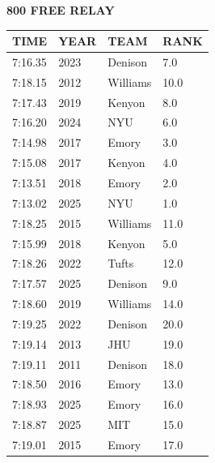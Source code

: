 \begin{table}[H]
\centering
\begin{minipage}[t]{0.6\textwidth}
\centering
\textbf{800 FREE RELAY}\\[0.1cm]
\begin{tabular}{@{}p{1.8cm}p{1.2cm}p{1.4cm}p{0.8cm}@{}}
\hline
    \textbf{TIME} & \textbf{YEAR} & \textbf{TEAM} & \textbf{RANK} \\
\hline
    7:16.35 & 2023 & Denison & 7.0 \\
    7:18.15 & 2012 & Williams & 10.0 \\
    7:17.43 & 2019 & Kenyon & 8.0 \\
    7:16.20 & 2024 & NYU & 6.0 \\
    7:14.98 & 2017 & Emory & 3.0 \\
    7:15.08 & 2017 & Kenyon & 4.0 \\
    7:13.51 & 2018 & Emory & 2.0 \\
    7:13.02 & 2025 & NYU & 1.0 \\
    7:18.25 & 2015 & Williams & 11.0 \\
    7:15.99 & 2018 & Kenyon & 5.0 \\
    7:18.26 & 2022 & Tufts & 12.0 \\
    7:17.57 & 2025 & Denison & 9.0 \\
    7:18.60 & 2019 & Williams & 14.0 \\
    7:19.25 & 2022 & Denison & 20.0 \\
    7:19.14 & 2013 & JHU & 19.0 \\
    7:19.11 & 2011 & Denison & 18.0 \\
    7:18.50 & 2016 & Emory & 13.0 \\
    7:18.93 & 2025 & Emory & 16.0 \\
    7:18.87 & 2025 & MIT & 15.0 \\
    7:19.01 & 2015 & Emory & 17.0 \\
\hline
\end{tabular}
\end{minipage}
\end{table}

